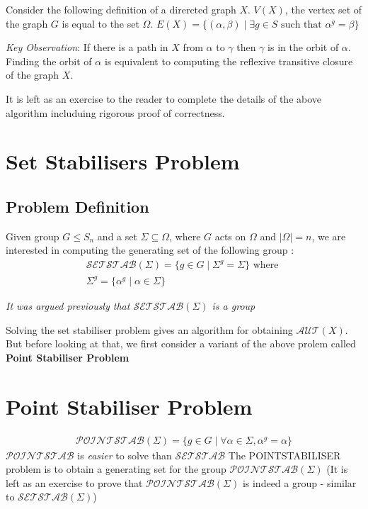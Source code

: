 Consider the following definition of a dirercted graph $X$.
$V(X)$, the vertex set of the graph $G$ is equal to
the set $\Omega$. 
$E(X) = \lbrace (\alpha, \beta) \mid \exists g \in S \text{ such that } \alpha^g = \beta \rbrace $

\textit{Key Observation}: If there is a path in $X$ from $\alpha$ to $\gamma$ 
then $\gamma$ is in the orbit of $\alpha$.
Finding the orbit of $\alpha$ is equivalent to computing the 
reflexive transitive closure of the graph $X$.

It is left as an exercise to the reader to complete the details
of the above algorithm includuing rigorous proof of correctness.

\section{Set Stabilisers Problem}

\subsection{Problem Definition}
Given group $G \leq S_n$ and a set $\Sigma \subseteq \Omega$, where $G$ acts on $\Omega$ 
and $|\Omega| = n$, we are interested in computing the generating set of the
following group :
\begin{align}
\mathcal{SETSTAB} (\Sigma) = \lbrace g \in G \mid \Sigma^g = \Sigma \rbrace \text{ where }\\
\Sigma^g = \lbrace \alpha^g \mid \alpha \in \Sigma \rbrace 
\end{align}

\textit{It was argued previously that $\mathcal{SETSTAB} (\Sigma)$ is a group}

Solving the set stabiliser problem gives an algorithm for obtaining $\mathcal{AUT}(X)$.
But before looking at that, we first consider a variant of the above prolem 
called \textbf{Point Stabiliser Problem}

\section{Point Stabiliser Problem}
\begin{align}
\mathcal{POINTSTAB} (\Sigma) = \lbrace g \in G \mid \forall \alpha \in \Sigma, \alpha^g = \alpha \rbrace
\end{align}
$\mathcal{POINTSTAB}$ is \emph{easier} to solve than $\mathcal{SETSTAB}$
The POINTSTABILISER problem is to obtain a generating set for the
group $\mathcal{POINTSTAB} (\Sigma)$ (It is left as an exercise to 
prove that $\mathcal{POINTSTAB} (\Sigma)$ is indeed a group - similar to
$\mathcal{SETSTAB} (\Sigma)$)

